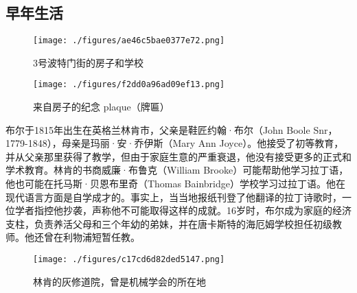 \subsection{早年生活}
\begin{figure}[ht]
\centering
\texttt{[image: ./figures/ae46c5bae0377e72.png]}
\caption{3号波特门街的房子和学校} \label{fig_George_2}
\end{figure}
\begin{figure}[ht]
\centering
\texttt{[image: ./figures/f2dd0a96ad09ef13.png]}
\caption{来自房子的纪念 plaque（牌匾）} \label{fig_George_3}
\end{figure}
布尔于1815年出生在英格兰林肯市，父亲是鞋匠约翰·布尔（John Boole Snr，1779-1848），母亲是玛丽·安·乔伊斯（Mary Ann Joyce）。他接受了初等教育，并从父亲那里获得了教学，但由于家庭生意的严重衰退，他没有接受更多的正式和学术教育。林肯的书商威廉·布鲁克（William Brooke）可能帮助他学习拉丁语，他也可能在托马斯·贝恩布里奇（Thomas Bainbridge）学校学习过拉丁语。他在现代语言方面是自学成才的。事实上，当当地报纸刊登了他翻译的拉丁诗歌时，一位学者指控他抄袭，声称他不可能取得这样的成就。16岁时，布尔成为家庭的经济支柱，负责养活父母和三个年幼的弟妹，并在唐卡斯特的海厄姆学校担任初级教师。他还曾在利物浦短暂任教。
\begin{figure}[ht]
\centering
\texttt{[image: ./figures/c17cd6d82ded5147.png]}
\caption{林肯的灰修道院，曾是机械学会的所在地} \label{fig_George_4}
\end{figure}